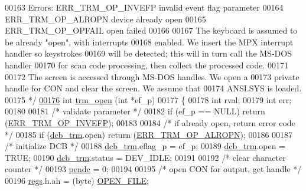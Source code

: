 \begin{DoxyCode}
00163 \textcolor{comment}{        Errors: ERR\_TRM\_OP\_INVEFP invalid event flag parameter}
00164 \textcolor{comment}{                ERR\_TRM\_OP\_ALROPN device already open}
00165 \textcolor{comment}{                ERR\_TRM\_OP\_OPFAIL open failed}
00166 \textcolor{comment}{}
00167 \textcolor{comment}{        The keyboard is assumed to be already "open", with interrupts}
00168 \textcolor{comment}{        enabled.  We insert the MPX interrupt handler so keystrokes}
00169 \textcolor{comment}{        will be detected;  this will in turn call the MS-DOS handler}
00170 \textcolor{comment}{        for scan code processing, then collect the processed code.}
00171 \textcolor{comment}{}
00172 \textcolor{comment}{        The screen is accessed through MS-DOS handles.  We open a}
00173 \textcolor{comment}{        private handle for CON and clear the screen.  We assume that}
00174 \textcolor{comment}{        ANSI.SYS is loaded.}
00175 \textcolor{comment}{*/}
\hypertarget{trmdrive_8c_source_l00176}{}\hyperlink{trmdrive_8h_aee9fd9776a799025c31cffe736facb3f}{00176} \textcolor{keywordtype}{int} \hyperlink{trmdrive_8c_aee9fd9776a799025c31cffe736facb3f}{trm_open} (\textcolor{keywordtype}{int} *ef\_p)
00177 \{
00178         \textcolor{keywordtype}{int}     rval;
00179         \textcolor{keywordtype}{int}     err;
00180 
00181         \textcolor{comment}{/* validate parameter */}
00182         \textcolor{keywordflow}{if} (ef\_p == NULL) \textcolor{keywordflow}{return} (\hyperlink{trmdrive_8h_a4cf9f35af3ffda71ffb9eef6f3ac9d52}{ERR_TRM_OP_INVEFP});
00183 
00184         \textcolor{comment}{/* if already open, return error code */}
00185         \textcolor{keywordflow}{if} (\hyperlink{trmdrive_8c_aeecf5b41137f812666e981eebea04e61}{dcb_trm}.open) \textcolor{keywordflow}{return} (\hyperlink{trmdrive_8h_aa972fb46ff1456a5b14a87df4d951f9c}{ERR_TRM_OP_ALROPN});
00186 
00187         \textcolor{comment}{/* initialize DCB */}
00188         \hyperlink{trmdrive_8c_aeecf5b41137f812666e981eebea04e61}{dcb_trm}.eflag\_p = ef\_p;
00189         \hyperlink{trmdrive_8c_aeecf5b41137f812666e981eebea04e61}{dcb_trm}.open = TRUE;
00190         \hyperlink{trmdrive_8c_aeecf5b41137f812666e981eebea04e61}{dcb_trm}.status = DEV\_IDLE;
00191 
00192         \textcolor{comment}{/* clear character counter */}
00193         \hyperlink{trmdrive_8c_a152186ebee09ccf193037184a35ae013}{pendc} = 0;
00194 
00195         \textcolor{comment}{/* open CON for output, get handle */}
00196         \hyperlink{trmdrive_8c_aaf347d1f75c4caba1a02aa49afc9324d}{regs}.h.ah = (byte) \hyperlink{trmdrive_8c_a1cdb6843f65f6b83b92156cb3ec61356}{OPEN_FILE};

\end{DoxyCode}
